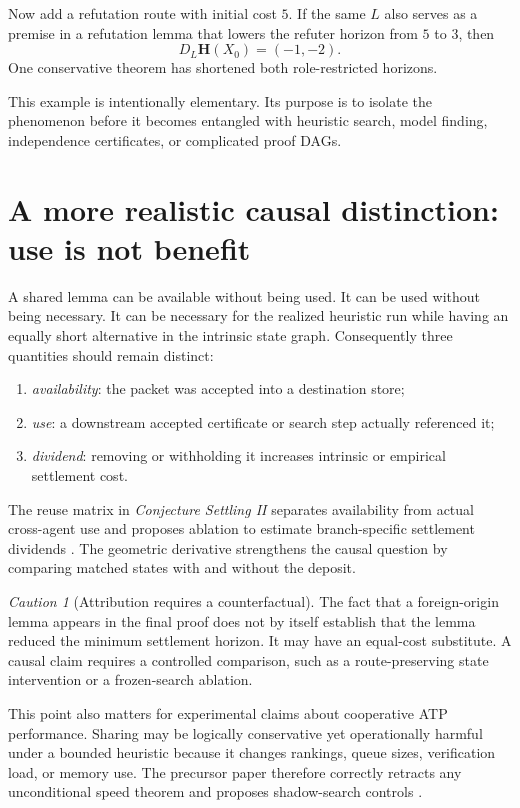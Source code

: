 \documentclass[11pt]{article}
\theoremstyle{remark}
\newtheorem{caution}[definition]{Caution}
\begin{document}
Now add a refutation route with initial cost $5$. If the same $L$ also serves as a premise in a refutation lemma that lowers the refuter horizon from $5$ to $3$, then
\[
D_L\mathbf H(X_0)=(-1,-2).
\]
One conservative theorem has shortened both role-restricted horizons.

This example is intentionally elementary. Its purpose is to isolate the phenomenon before it becomes entangled with heuristic search, model finding, independence certificates, or complicated proof DAGs.

\section{A more realistic causal distinction: use is not benefit}

A shared lemma can be available without being used. It can be used without being necessary. It can be necessary for the realized heuristic run while having an equally short alternative in the intrinsic state graph. Consequently three quantities should remain distinct:
\begin{enumerate}
\item \emph{availability}: the packet was accepted into a destination store;
\item \emph{use}: a downstream accepted certificate or search step actually referenced it;
\item \emph{dividend}: removing or withholding it increases intrinsic or empirical settlement cost.
\end{enumerate}

The reuse matrix in \emph{Conjecture Settling II} separates availability from actual cross-agent use and proposes ablation to estimate branch-specific settlement dividends \cite{TennesonCSII}. The geometric derivative strengthens the causal question by comparing matched states with and without the deposit.

\begin{caution}[Attribution requires a counterfactual]
The fact that a foreign-origin lemma appears in the final proof does not by itself establish that the lemma reduced the minimum settlement horizon. It may have an equal-cost substitute. A causal claim requires a controlled comparison, such as a route-preserving state intervention or a frozen-search ablation.
\end{caution}

This point also matters for experimental claims about cooperative ATP performance. Sharing may be logically conservative yet operationally harmful under a bounded heuristic because it changes rankings, queue sizes, verification load, or memory use. The precursor paper therefore correctly retracts any unconditional speed theorem and proposes shadow-search controls \cite{TennesonCSII}.
\end{document}
